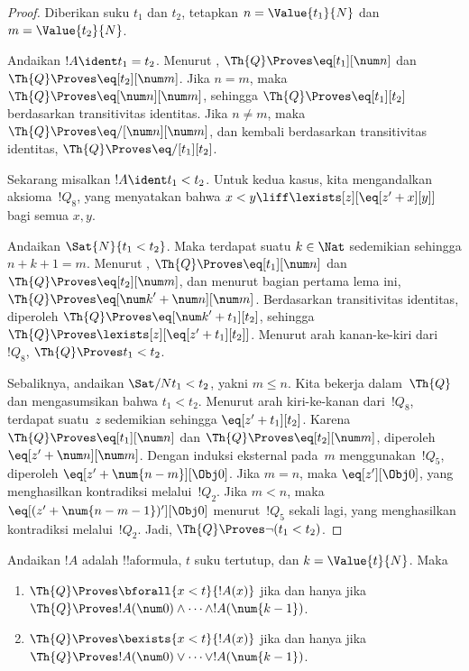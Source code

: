 \documentclass[../../../include/open-logic-section]{subfiles}
\begin{document}
\begin{proof}
Diberikan suku $t_1$ dan $t_2$, tetapkan $n = \Value{t_1}{N}$ dan
$m = \Value{t_2}{N}$.

Andaikan $!A \ident t_1 = t_2$. Menurut ,
$\Th{Q} \Proves \eq[t_1][\num n]$ dan
$\Th{Q} \Proves \eq[t_2][\num m]$. Jika $n = m$, maka
$\Th{Q} \Proves \eq[\num n][\num m]$, sehingga
$\Th{Q} \Proves \eq[t_1][t_2]$ berdasarkan transitivitas identitas.
Jika $n \neq m$, maka $\Th{Q} \Proves \eq/[\num n][\num m]$, dan kembali
berdasarkan transitivitas identitas,
$\Th{Q} \Proves \eq/[t_1][t_2]$.

Sekarang misalkan $!A \ident t_1 < t_2$. Untuk kedua kasus, kita mengandalkan
aksioma~$!Q_8$, yang menyatakan bahwa
$x < y \liff \lexists[z][\eq[z' + x][y]]$ bagi semua $x,y$.

Andaikan $\Sat{N}{t_1 < t_2}$. Maka terdapat suatu $k \in \Nat$ sedemikian
sehingga $n + k + 1 = m$. Menurut ,
$\Th{Q} \Proves \eq[t_1][\num n]$ dan
$\Th{Q} \Proves \eq[t_2][\num m]$, dan menurut bagian pertama lema ini,
$\Th{Q} \Proves \eq[ {\num k}' + \num n][\num m]$. Berdasarkan
transitivitas identitas, diperoleh
$\Th{Q} \Proves \eq[ {\num k}' + t_1][t_2]$, sehingga
$\Th{Q} \Proves \lexists[z][\eq[z' + t_1][t_2]]$. Menurut arah kanan-ke-kiri
dari~$!Q_8$, $\Th{Q} \Proves t_1 < t_2$.

Sebaliknya, andaikan $\Sat/{N}{t_1 < t_2}$, yakni $m \leq n$.
%
Kita bekerja dalam~$\Th{Q}$ dan mengasumsikan bahwa $t_1 < t_2$. Menurut arah
kiri-ke-kanan dari~$!Q_8$, terdapat suatu~$z$ sedemikian sehingga
$\eq[z' + t_1][t_2]$. Karena $\Th{Q} \Proves \eq[t_1][\num n]$ dan
$\Th{Q} \Proves \eq[t_2][\num m]$, diperoleh
$\eq[z' + \num n][\num m]$.
%
Dengan induksi eksternal pada~$m$ menggunakan~$!Q_5$, diperoleh
$\eq[z' + \num{n - m}][\Obj 0]$. Jika $m = n$, maka
$\eq[z'][\Obj 0]$, yang menghasilkan kontradiksi melalui~$!Q_2$.
Jika $m < n$, maka $\eq[(z' + \num{n - m - 1})'][\Obj 0]$ menurut~$!Q_5$
sekali lagi, yang menghasilkan kontradiksi melalui~$!Q_2$.
Jadi, $\Th{Q} \Proves \lnot(t_1 < t_2)$.
\end{proof}

\begin{lem}
Andaikan $!A$ adalah !!a{formula}, $t$ suku tertutup, dan
$k=\Value{t}{N}$. Maka
\begin{enumerate}
\item $\Th{Q} \Proves \bforall{x<t}{!A(x)}$ jika dan hanya jika
    $\Th{Q} \Proves !A(\num 0) \land \dots \land !A(\num{k-1})$.
\item $\Th{Q} \Proves \bexists{x<t}{!A(x)}$ jika dan hanya jika
    $\Th{Q} \Proves !A(\num 0) \lor \dots \lor !A(\num{k-1})$.
\end{enumerate}
\end{lem}
\end{document}
